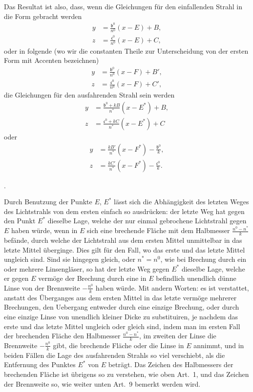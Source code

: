 \documentclass[11pt,a4paper]{article}
\begin{document}
Das Resultat ist also, dass, wenn die Gleichungen für den einfallenden Strahl in die Form gebracht werden
\begin{align*}
y &= \tfrac{\mathfrak{b}^0}{n^0}(x - E) + B, \\
z &= \tfrac{\mathfrak{c}^0}{n^0}(x - E) + C,
\end{align*}
oder in folgende (wo wir die constanten Theile zur Unterscheidung von der ersten Form mit Accenten bezeichnen)
\begin{align*}
y &= \tfrac{\mathfrak{b}^0}{n^0}(x - F) + B', \\
z &= \tfrac{\mathfrak{c}^0}{n^0}(x - F) + C',
\end{align*}
die Gleichungen für den ausfahrenden Strahl sein werden
\begin{align*}
y &= \tfrac{\mathfrak{b}^0 + kB}{n^*}(x - E^*) + B, \\
z &= \tfrac{\mathfrak{c}^0 + kC}{n^*}(x - E^*) + C
\end{align*}
oder
\begin{align*}
y &= \tfrac{kB'}{n^*}(x - F^*) - \tfrac{\mathfrak{b}^0}{k}, \\
z &= \tfrac{kC'}{n^*}(x - F^*) - \tfrac{\mathfrak{c}^0}{k}.
\end{align*}

\newpage
{}.

\smallskip
Durch Benutzung der Punkte $E$, $E^*$ lässt sich die Abhängigkeit des letzten Weges des Lichtstrahls von dem ersten einfach so ausdrücken: der letzte Weg hat gegen den Punkt $E^*$ dieselbe Lage, welche der nur einmal gebrochene Lichtstrahl gegen $E$ haben würde, wenn in $E$ sich eine brechende Fläche mit dem Halbmesser $\frac{n^0 - n^*}{k}$ befände, durch welche der Lichtstrahl aus dem ersten Mittel unmittelbar in das letzte Mittel überginge. Dies gilt für den Fall, wo das erste und das letzte Mittel ungleich sind. Sind sie hingegen gleich, oder $n^* = n^0$, wie bei Brechung durch ein oder mehrere Linsengläser, so hat der letzte Weg gegen $E^*$ dieselbe Lage, welche er gegen $E$ vermöge der Brechung durch eine in $E$ befindlich unendlich dünne Linse von der Brennweite $-\frac{n^0}{k}$ haben würde. Mit andern Worten: es ist verstattet, anstatt des Überganges aus dem ersten Mittel in das letzte vermöge mehrerer Brechungen, den Uebergang entweder durch eine einzige Brechung, oder durch eine einzige Linse von unendlich kleiner Dicke zu substituiren, je nachdem das erste und das letzte Mittel ungleich oder gleich sind, indem man im ersten Fall der brechenden Fläche den Halbmesser $\frac{n^0 - n^*}{k}$, im zweiten der Linse die Brennweite $-\frac{n^0}{k}$ gibt, die brechende Fläche oder die Linse in $E$ annimmt, und in beiden Fällen die Lage des ausfahrenden Strahls so viel verschiebt, als die Entfernung des Punktes $E^*$ von $E$ beträgt. Das Zeichen des Halbmessers der brechenden Fläche ist übrigens so zu verstehen, wie oben Art.~1, und das Zeichen der Brennweite so, wie weiter unten Art.~9 bemerkt werden wird.
\end{document}
